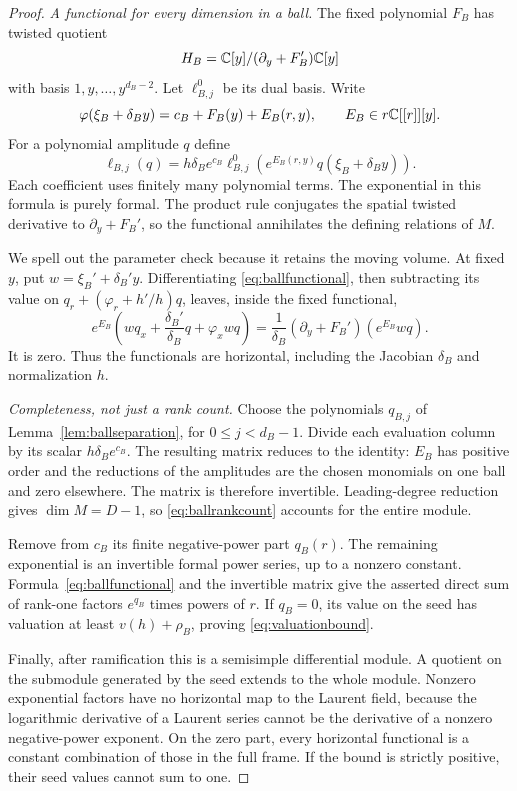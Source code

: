 \begin{proof}
\emph{A functional for every dimension in a ball.}
The fixed polynomial $F_B$ has twisted quotient
\[
 H_B=\mathbb C[y]/(\partial_y+F_B')\mathbb C[y]
\]
with basis $1,y,\ldots,y^{d_B-2}$. Let $\ell^0_{B,j}$ be its dual
basis. Write
\[
 \varphi(\xi_B+\delta_B y)=c_B+F_B(y)+E_B(r,y),
 \qquad E_B\in r\mathbb C[[r]][y].
\]
For a polynomial amplitude $q$ define
\begin{equation}\label{eq:ballfunctional}
 \ell_{B,j}(q)=h\delta_B e^{c_B}
   \ell^0_{B,j}\!\left(e^{E_B(r,y)}q(\xi_B+\delta_B y)\right).
\end{equation}
Each coefficient uses finitely many polynomial terms. The exponential
in this formula is purely formal. The product rule conjugates the
spatial twisted derivative to $\partial_y+F_B'$, so the functional
annihilates the defining relations of $M$.

We spell out the parameter check because it retains the moving volume.
At fixed $y$, put $w=\xi_B'+\delta_B'y$. Differentiating
\eqref{eq:ballfunctional}, then subtracting its value on
$q_r+(\varphi_r+h'/h)q$, leaves, inside the fixed functional,
\[
 e^{E_B}\left(wq_x+\frac{\delta_B'}{\delta_B}q+\varphi_xwq\right)
 =\frac1{\delta_B}(\partial_y+F_B')
                      \left(e^{E_B}wq\right).
\]
It is zero. Thus the functionals are horizontal, including the
Jacobian $\delta_B$ and normalization $h$.

\emph{Completeness, not just a rank count.}
Choose the polynomials $q_{B,j}$ of
Lemma~\ref{lem:ballseparation}, for $0\leq j<d_B-1$.
Divide each evaluation column by its scalar $h\delta_Be^{c_B}$.
The resulting matrix reduces to the identity: $E_B$ has positive
order and the reductions of the amplitudes are the chosen monomials
on one ball and zero elsewhere. The matrix is therefore invertible.
Leading-degree reduction gives $\dim M=D-1$, so
\eqref{eq:ballrankcount} accounts for the entire module.

Remove from $c_B$ its finite negative-power part $q_B(r)$.
The remaining exponential is an invertible formal power series,
up to a nonzero constant. Formula~\eqref{eq:ballfunctional} and the
invertible matrix give the asserted direct sum of rank-one factors
$e^{q_B}$ times powers of $r$. If $q_B=0$, its value on the seed
has valuation at least $v(h)+\rho_B$, proving
\eqref{eq:valuationbound}.

Finally, after ramification this is a semisimple differential module.
A quotient on the submodule generated by the seed extends to the
whole module. Nonzero exponential factors have no horizontal map
to the Laurent field, because the logarithmic derivative of a
Laurent series cannot be the derivative of a nonzero negative-power
exponent. On the zero part, every horizontal functional is a
constant combination of those in the full frame. If the bound is
strictly positive, their seed values cannot sum to one.
\end{proof}

